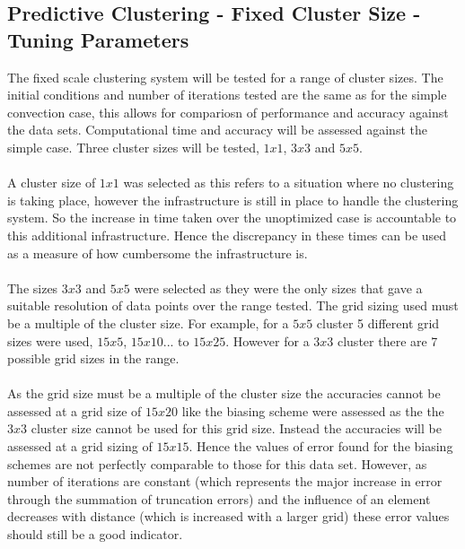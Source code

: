 \subsection{Predictive Clustering - Fixed Cluster Size - Tuning Parameters}
The fixed scale clustering system will be tested for a range of cluster sizes. The initial conditions and number of iterations tested are the same as for the simple convection case, this allows for compariosn of performance and accuracy against the data sets. Computational time and accuracy will be assessed against the simple case. Three cluster sizes will be tested, $1x1$, $3x3$ and $5x5$.
\\\\
A cluster size of $1x1$ was selected as this refers to a situation where no clustering is taking place, however the infrastructure is still in place to handle the clustering system. So the increase in time taken over the unoptimized case is accountable to this additional infrastructure. Hence the discrepancy in these times can be used as a measure of how cumbersome the infrastructure is.
\\\\
The sizes $3x3$ and $5x5$ were selected as they were the only sizes that gave a suitable resolution of data points over the range tested. The grid sizing used must be a multiple of the cluster size. For example, for a $5x5$ cluster 5 different grid sizes were used, $15x5$, $15x10$... to $15x25$. However for a $3x3$ cluster there are 7 possible grid sizes in the range.
\\\\
As the grid size must be a multiple of the cluster size  the accuracies cannot be assessed at a grid size of $15x20$ like the biasing scheme were assessed as the the $3x3$ cluster size cannot be used for this grid size. Instead the accuracies will be assessed at a grid sizing of $15x15$. Hence the values of error found for the biasing schemes are not perfectly comparable to those for this data set. However, as number of iterations are constant (which represents the major increase in error through the summation of truncation errors) and the influence of an element decreases with distance (which is increased with a larger grid) these error values should still be a good indicator.
\\\\
